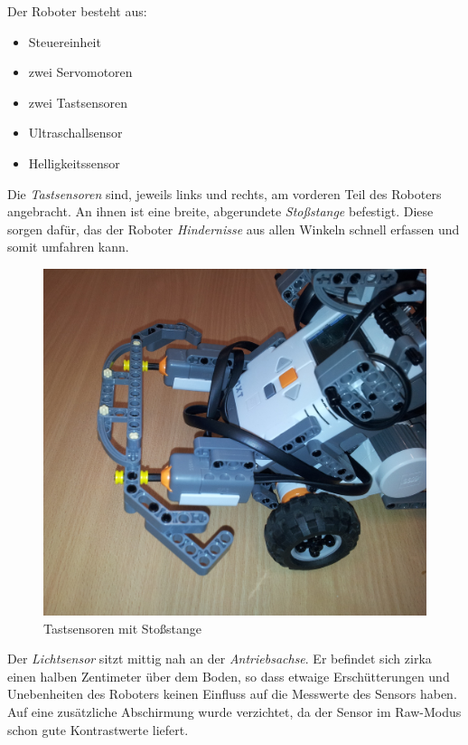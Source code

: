 \documentclass[a4paper]{article}
\begin{document}
Der Roboter besteht aus:
\begin{itemize}
\item Steuereinheit
\item zwei Servomotoren
\item zwei Tastsensoren
\item Ultraschallsensor
\item Helligkeitssensor
\end{itemize}

Die \emph{Tastsensoren} sind, jeweils links und rechts, am vorderen
Teil des Roboters angebracht. An ihnen ist eine breite, abgerundete
\emph{Stoßstange} befestigt. Diese sorgen dafür, das der Roboter
\emph{Hindernisse} aus allen Winkeln schnell erfassen und somit
umfahren kann.

\begin{figure}[h]
  \centering
  \caption{Tastsensoren mit Stoßstange}
  \includegraphics[scale=0.06]{roboter_tastsensor.jpg}
\end{figure}

Der \emph{Lichtsensor} sitzt mittig nah an der \emph{Antriebsachse}.
Er befindet sich zirka einen halben Zentimeter über dem Boden, so dass
etwaige Erschütterungen und Unebenheiten des Roboters keinen Einfluss
auf die Messwerte des Sensors haben. Auf eine zusätzliche Abschirmung
wurde verzichtet, da der Sensor im Raw-Modus schon gute Kontrastwerte
liefert.
\end{document}
